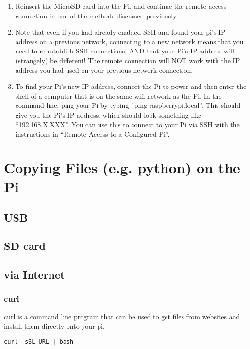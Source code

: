 \documentclass{article}\usepackage[]{graphicx}\usepackage[]{color}
\begin{document}
\begin{enumerate}
\item Reinsert the MicroSD card into the Pi, and continue the remote access connection in one of the methods discussed previously.

\item Note that even if you had already enabled SSH and found your pi's IP address on a previous network, connecting to a new network means that you need to re-establish SSH connections, AND that your Pi's IP address will (strangely) be different!  The remote connection will NOT work with the IP address you had used on your previous network connection.

\item To find your Pi's new IP address, connect the Pi to power and then enter the shell of a computer that is on the same wifi network as the Pi.  In the command line, ping your Pi by typing ``ping raspberrypi.local''.  This should give you the Pi's IP address, which should look something like ``192.168.X.XXX''.  You can use this to connect to your Pi via SSH with the instructions in ``Remote Access to a Configured Pi''.

\end{enumerate}

\section{Copying Files (e.g. python) on the Pi}

\subsection{USB}

\subsection{SD card}

\subsection{via Internet}

\subsubsection{curl}

curl is a command line program that can be used to get files from websites and install them directly onto your pi.



\begin{lstlisting}
curl -sSL URL | bash
\end{lstlisting}
\end{document}
